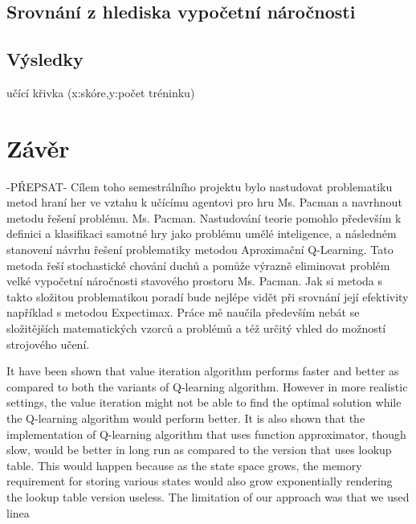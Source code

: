 \section{Srovnání z hlediska vypočetní náročnosti}
\section{Výsledky}
učící křivka (x:skóre,y:počet tréninku)

\chapter{Závěr}
-PŘEPSAT-
Cílem toho semestrálního projektu bylo nastudovat problematiku metod hraní her ve vztahu k učícímu agentovi pro hru Ms. Pacman a navrhnout metodu řešení problému. Ms. Pacman. Nastudování teorie pomohlo především k definici a klasifikaci samotné hry jako problému umělé inteligence, a následném stanovení návrhu řešení problematiky metodou Aproximační Q-Learning. Tato metoda řeší stochastické chování duchů a pomůže výrazně eliminovat problém velké vypočetní náročnosti stavového prostoru Ms. Pacman. Jak si metoda s takto složitou problematikou poradí bude nejlépe vidět při srovnání její efektivity například s metodou Expectimax. Práce mě naučila především nebát se složitějších matematických vzorců a problémů a též určitý vhled do možností strojového učení.

It have been shown that value iteration algorithm performs faster and better
as compared to both the variants of Q-learning algorithm. However in more
realistic settings, the value iteration might not be able to find the optimal
solution while the Q-learning algorithm would perform better. It is also
shown that the implementation of Q-learning algorithm that uses function
approximator, though slow, would be better in long run as compared to the
version that uses lookup table. This would happen because as the state space
grows, the memory requirement for storing various states would also grow
exponentially rendering the lookup table version useless.
The limitation of our approach was that we used linea

